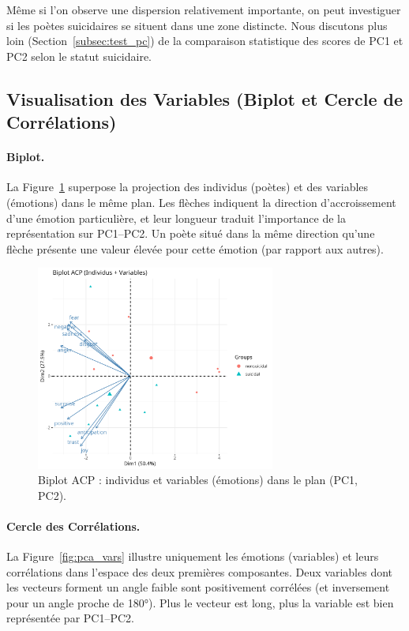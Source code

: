 \documentclass[12pt,a4paper]{article}
\begin{document}
Même si l'on observe une dispersion relativement importante, 
on peut investiguer si les poètes suicidaires se situent dans une zone distincte. 
Nous discutons plus loin (Section~\ref{subsec:test_pc}) 
de la comparaison statistique des scores de PC1 et PC2 selon le statut suicidaire.

\subsection{Visualisation des Variables (Biplot et Cercle de Corrélations)}
\paragraph{Biplot.}
La Figure~\ref{fig:pca_biplot} superpose la projection des individus (poètes) 
et des variables (émotions) dans le même plan. Les flèches indiquent 
la direction d'accroissement d'une émotion particulière, 
et leur longueur traduit l'importance de la représentation sur PC1--PC2. 
Un poète situé dans la même direction qu'une flèche 
présente une valeur élevée pour cette émotion (par rapport aux autres).

\begin{figure}[htbp]
	\centering
	\includegraphics[width=0.7\textwidth]{03_pca_biplot.png}
	\caption{Biplot ACP : individus et variables (émotions) dans le plan (PC1, PC2).}
	\label{fig:pca_biplot}
\end{figure}

\paragraph{Cercle des Corrélations.}
La Figure~\ref{fig:pca_vars} illustre uniquement les émotions (variables) 
et leurs corrélations dans l'espace des deux premières composantes. 
Deux variables dont les vecteurs forment un angle faible 
sont positivement corrélées (et inversement pour un angle proche de 180°). 
Plus le vecteur est long, plus la variable est bien représentée par PC1--PC2.
\end{document}
